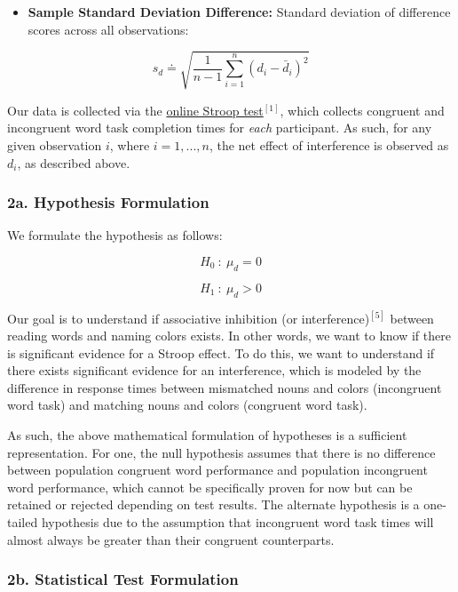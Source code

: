 \documentclass[11pt]{article}
\providecommand{\tightlist}{%
      \setlength{\itemsep}{0pt}\setlength{\parskip}{0pt}}
\begin{document}
\begin{itemize}
\tightlist
\item
  \textbf{Sample Standard Deviation Difference:} Standard deviation of
  difference scores across all observations:
\end{itemize}

\[s_{{d}} \doteq \sqrt{\frac{1}{n - 1}\sum_{i = 1}^{n} \left ( d_{i} - \bar{d}_{i} \right )^{2}}\]

Our data is collected via the
\href{https://faculty.washington.edu/chudler/java/ready.html}{online
Stroop test}\(^{[1]}\), which collects congruent and incongruent word
task completion times for \emph{each} participant. As such, for any
given observation \(i\), where \(i = 1, ..., n\), the net effect of
interference is observed as \(d_{i}\), as described above.

    \hypertarget{a.-hypothesis-formulation}{%
\subsubsection{2a. Hypothesis
Formulation}\label{a.-hypothesis-formulation}}

    We formulate the hypothesis as follows:

\[H_{0} \: : \: \mu_d = 0\]

\[H_{1} \: : \: \mu_d > 0\]

Our goal is to understand if associative inhibition (or
interference)\(^{[5]}\) between reading words and naming colors exists.
In other words, we want to know if there is significant evidence for a
Stroop effect. To do this, we want to understand if there exists
significant evidence for an interference, which is modeled by the
difference in response times between mismatched nouns and colors
(incongruent word task) and matching nouns and colors (congruent word
task).

As such, the above mathematical formulation of hypotheses is a
sufficient representation. For one, the null hypothesis assumes that
there is no difference between population congruent word performance and
population incongruent word performance, which cannot be specifically
proven for now but can be retained or rejected depending on test
results. The alternate hypothesis is a one-tailed hypothesis due to the
assumption that incongruent word task times will almost always be
greater than their congruent counterparts.

    \hypertarget{b.-statistical-test-formulation}{%
\subsubsection{2b. Statistical Test
Formulation}\label{b.-statistical-test-formulation}}
\end{document}
